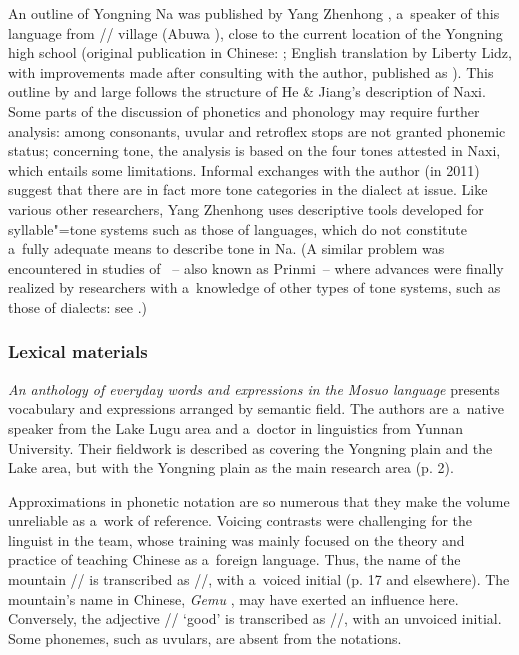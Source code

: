 An outline of Yongning Na was published by Yang Zhenhong , a~speaker of this language
from // village (Abuwa ), close to the current location of
the Yongning high school (original publication in Chinese: \citealt{yang2006d}; {English} translation
by Liberty Lidz, with improvements made after consulting with the author, published as \citealt{yang2009}). This outline by and large follows the structure of
He \& Jiang’s description of Naxi. Some parts of the discussion of phonetics and phonology may
require further analysis: among consonants, uvular and retroflex stops are not granted phonemic
status; concerning tone, the analysis is based on the four tones attested in Naxi, which entails
some limitations. Informal exchanges with the author (in 2011) suggest that there are in fact more
tone categories in the dialect at issue. Like various other researchers, Yang Zhenhong uses descriptive
tools developed for syllable"=tone systems such as those of  languages, which do not
constitute a~fully adequate means to describe tone in Na. (A similar problem was encountered in studies
of ~-- also known as Prinmi~-- where advances were finally realized by researchers with a~knowledge of
other types of tone systems, such as those of  dialects: see
\citealt{ding2001,ding2006,jacques2011a}.)


\subsubsection{Lexical materials}
\label{sec:dictionary2013}

\textit{An anthology of everyday words and expressions in the Mosuo language} \citep{zhibaetal2013} presents vocabulary and expressions arranged by semantic field. The authors are a~native speaker from the Lake Lugu area and a~doctor in linguistics from Yunnan University. Their fieldwork is described as covering the Yongning plain and the Lake area, but with the Yongning plain as the main research area (p. 2). 

Approximations in phonetic notation are so numerous that they make the volume unreliable as a~work of reference. Voicing contrasts were challenging for the linguist in the team, whose training was mainly focused on the theory and practice of teaching Chinese as a~foreign language. Thus, the name of the mountain // is transcribed as //, with a~voiced initial (p. 17 and elsewhere). The mountain's name in Chinese, \textit{Gemu} , may have exerted an influence here. Conversely, the adjective // ‘good’ is transcribed as //, with an unvoiced initial. Some phonemes, such as uvulars, are absent from the notations. 


